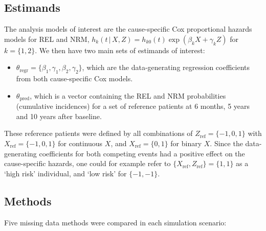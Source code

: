 \documentclass[
  letterpaper,
  DIV=11,
  numbers=noendperiod]{scrreprt}
\newcommand{\given}{\,|\,}
\begin{document}
\subsection{Estimands}\label{estimands}

The analysis models of interest are the cause-specific Cox proportional
hazards models for REL and NRM,
\(h_k(t \given X, Z) = h_{k0}(t)\exp(\beta_k X + \gamma_k Z)\) for
\(k = \{1,2\}\). We then have two main sets of estimands of interest:

\begin{itemize}
\item
  \(\theta_{\text{regr}} = \{\beta_1,\gamma_1,\beta_2,\gamma_2\}\),
  which are the data-generating regression coefficients from both
  cause-specific Cox models.
\item
  \(\theta_{\text{pred}}\), which is a vector containing the REL and NRM
  probabilities (cumulative incidences) for a set of reference patients
  at 6 months, 5 years and 10 years after baseline.
\end{itemize}

These reference patients were defined by all combinations of
\(Z_{\text{ref}} = \{-1,0,1\}\) with \(X_{\text{ref}} = \{-1,0,1\}\) for
continuous \(X\), and \(X_{\text{ref}} = \{0,1\}\) for binary \(X\).
Since the data-generating coefficients for both competing events had a
positive effect on the cause-specific hazards, one could for example
refer to \(\{X_{\text{ref}},Z_{\text{ref}}\} = \{1, 1\}\) as a `high
risk' individual, and `low risk' for \(\{-1, -1\}\).

\subsection{Methods}\label{methods}

Five missing data methods were compared in each simulation scenario:
\end{document}
